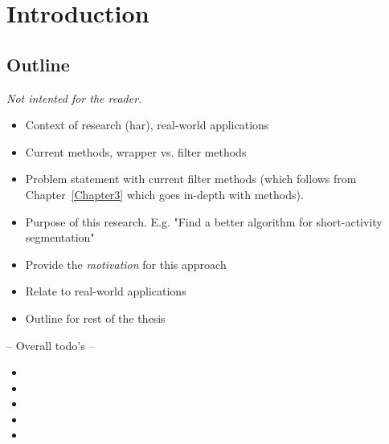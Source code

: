 
\chapter{Introduction}

\label{Chapter1} %



\section{Outline}
\emph{Not intented for the reader.}
\begin{itemize}
  \item Context of research (\gls{har}), real-world applications
  \item Current methods, wrapper vs. filter methods
  \item Problem statement with current filter methods (which follows from Chapter~\ref{Chapter3} which goes in-depth with methods).
  \item Purpose of this research. E.g. "Find a better algorithm for short-activity segmentation"
  \item Provide the \emph{motivation} for this approach
  \item Relate to real-world applications
  \item Outline for rest of the thesis
\end{itemize}

-- Overall todo's --
\begin{itemize}
  \item {}
  \item {}
  \item {}
  \item {}
  \item {}
\end{itemize}

